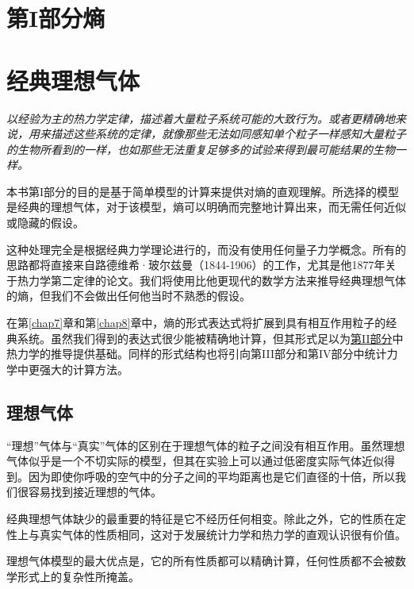 \documentclass[UTF8]{ctexart}
\numberwithin{equation}{section}%
\numberwithin{figure}{section}%
\begin{document}
    \section*{第I部分\quad 熵}
    \label{part1}

    \section{经典理想气体}
    \label{chap2}
    \textit{以经验为主的热力学定律，描述着大量粒子系统可能的大致行为。或者更精确地来说，用来描述这些系统的定律，就像那些无法如同感知单个粒子一样感知大量粒子的生物所看到的一样，也如那些无法重复足够多的试验来得到最可能结果的生物一样。
    \\}

    本书第I部分的目的是基于简单模型的计算来提供对熵的直观理解。所选择的模型是经典的理想气体，对于该模型，熵可以明确而完整地计算出来，而无需任何近似或隐藏的假设。
    
    这种处理完全是根据经典力学理论进行的，而没有使用任何量子力学概念。所有的思路都将直接来自路德维希·玻尔兹曼（1844-1906）的工作，尤其是他1877年关于热力学第二定律的论文。我们将使用比他更现代的数学方法来推导经典理想气体的熵，但我们不会做出任何他当时不熟悉的假设。
    
    在第\ref{chap7}章和第\ref{chap8}章中，熵的形式表达式将扩展到具有相互作用粒子的经典系统。虽然我们得到的表达式很少能被精确地计算，但其形式足以为\hyperref[part2]{第II部分}中热力学的推导提供基础。同样的形式结构也将引向第III部分和第IV部分中统计力学中更强大的计算方法。

    \subsection{理想气体}
    
    “理想”气体与“真实”气体的区别在于理想气体的粒子之间没有相互作用。虽然理想气体似乎是一个不切实际的模型，但其在实验上可以通过低密度实际气体近似得到。因为即使你呼吸的空气中的分子之间的平均距离也是它们直径的十倍，所以我们很容易找到接近理想的气体。

    经典理想气体缺少的最重要的特征是它不经历任何相变。除此之外，它的性质在定性上与真实气体的性质相同，这对于发展统计力学和热力学的直观认识很有价值。

    理想气体模型的最大优点是，它的所有性质都可以精确计算，任何性质都不会被数学形式上的复杂性所掩盖。
\end{document}
